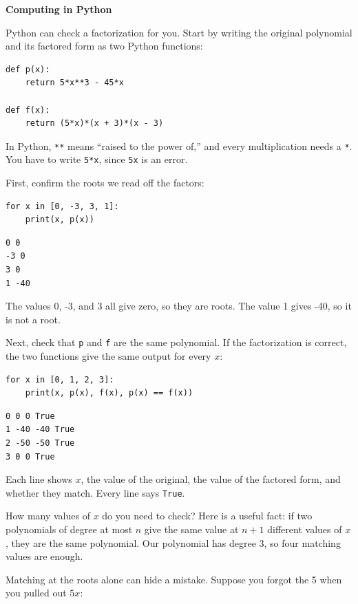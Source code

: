 \textbf{Computing in Python}

Python can check a factorization for you. Start by writing the
original polynomial and its factored form as two Python functions:

\begin{verbatim}
def p(x):
    return 5*x**3 - 45*x

def f(x):
    return (5*x)*(x + 3)*(x - 3)
\end{verbatim}

In Python, \texttt{**} means ``raised to the power of,'' and
every multiplication needs a \texttt{*}. You have to write
\texttt{5*x}, since \texttt{5x} is an error.

First, confirm the roots we read off the factors:

\begin{verbatim}
for x in [0, -3, 3, 1]:
    print(x, p(x))
\end{verbatim}

\begin{verbatim}
0 0
-3 0
3 0
1 -40
\end{verbatim}

The values 0, -3, and 3 all give zero, so they are roots. The value 1
gives -40, so it is not a root.

Next, check that \texttt{p} and \texttt{f} are
the same polynomial. If the factorization is correct, the two functions
give the same output for every $x$:

\begin{verbatim}
for x in [0, 1, 2, 3]:
    print(x, p(x), f(x), p(x) == f(x))
\end{verbatim}

\begin{verbatim}
0 0 0 True
1 -40 -40 True
2 -50 -50 True
3 0 0 True
\end{verbatim}

Each line shows $x$, the value of the original, the value of the
factored form, and whether they match. Every line says
\texttt{True}.

How many values of $x$ do you need to check? Here is a useful fact: if
two polynomials of degree at most $n$ give the same value at $n + 1$ different
values of $x$, they are the same polynomial. Our polynomial has degree
3, so four matching values are enough.

Matching at the roots alone can hide a mistake. Suppose you forgot the 5 when
you pulled out $5x$:

